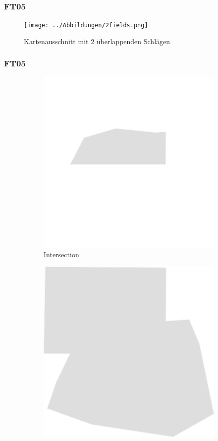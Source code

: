 \documentclass{beamer}
\begin{document}
\begin{frame}\frametitle{FT05}
\begin{figure}
\texttt{[image: ../Abbildungen/2fields.png]}
\caption[Kartenausschnitt mit 2 überlappenden Schlägen]{Kartenausschnitt mit 2 überlappenden Schlägen}
\end{figure}
\end{frame}

\begin{frame}\frametitle{FT05}
\setcounter{subfigure}{0}\begin{figure}
\begin{subfigure}{.3\textwidth}
  \includegraphics[width=.7\linewidth]{../Abbildungen/st_intersection.png}
  \caption{Intersection}
\end{subfigure}%
\begin{subfigure}{.3\textwidth}
  \includegraphics[width=.7\linewidth]{../Abbildungen/st_union.png}

\end{subfigure}
\end{figure}
\end{frame}
\end{document}
